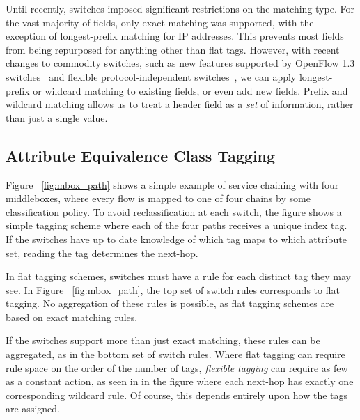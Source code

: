 Until recently, switches imposed significant restrictions on the matching type.  For the vast majority of fields, only exact matching was supported, with the exception of longest-prefix matching for IP addresses. This prevents most fields from being repurposed for anything other than flat tags. However, with recent changes to commodity switches, such as new features supported by OpenFlow 1.3 switches~\cite{of13} and flexible protocol-independent switches~\cite{P4}, we can apply longest-prefix or wildcard matching to existing fields, or even add new fields. Prefix and wildcard matching allows us to treat a header field as a \emph{set} of information, rather than just a single value. 

\subsection{Attribute Equivalence Class Tagging}
 Figure ~\ref{fig:mbox_path} shows a simple example of service chaining with four middleboxes, where every flow is mapped to one of four chains by some classification policy. To avoid reclassification at each switch, the figure shows a simple tagging scheme where each of the four paths receives a unique index tag. If the switches have up to date knowledge of which tag maps to which attribute set, reading the tag determines the next-hop. 
 
 In flat tagging schemes, switches must have a rule for each distinct tag they may see. In Figure ~\ref{fig:mbox_path}, the top set of switch rules corresponds to flat tagging. No aggregation of these rules is possible, as flat tagging schemes are based on exact matching rules. 
 
If the switches support more than just exact matching, these rules can be aggregated, as in the bottom set of switch rules. Where flat tagging can require rule space on the order of the number of tags, \emph{flexible tagging} can require as few as a constant action, as seen in in the figure where each next-hop has exactly one corresponding wildcard rule. Of course, this depends entirely upon how the tags are assigned.

